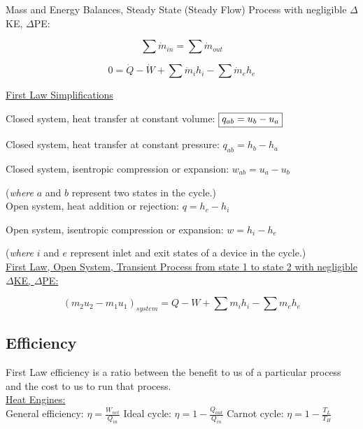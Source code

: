 \documentclass[10pt]{article}
\begin{document}
\noindent
Mass and Energy Balances, Steady State (Steady Flow) Process with negligible $\Delta$KE, $\Delta$PE:

$$\sum \dot{m}_{in} = \sum \dot{m}_{out}$$

$$0  = \dot Q - \dot W + \sum \dot{m}_{i}h_{i} -\sum \dot{m}_{e}h_{e}$$

\medskip


\underline{First Law Simplifications}

Closed system, heat transfer at constant volume: \hspace{0.25cm} $\boxed{$$q_{ab}=u_b-u_a}$

Closed system, heat transfer at constant pressure: \hspace{0.25cm} $\boxed{q_{ab}=h_b-h_a}$

Closed system, isentropic compression or expansion: \hspace{0.25cm} $\boxed{w_{ab}=u_a-u_b}$

(\textit{where} $a$ and $b$ represent two states in the cycle.)\\

Open system, heat addition or rejection: \hspace{0.25cm} $\boxed{q=h_e-h_i}$

Open system, isentropic compression or expansion: \hspace{0.25cm} $\boxed{w=h_i-h_e}$

(\textit{where} $i$ and $e$ represent inlet and exit states of a device in the cycle.)\\


\noindent
\underline{First Law, Open System, Transient Process from state 1 to state 2 with negligible $\Delta$KE, $\Delta$PE:}

$$(m_2u_2 - m_1u_1)_{system} = Q - W + \sum m_ih_i - \sum m_eh_e$$

\subsection{Efficiency}

First Law efficiency is a ratio between the benefit to us of a particular process and the cost to us to run that process.\\

\noindent
\underline{Heat Engines:} \\
\noindent
General efficiency: $\eta = \frac{W_{net}}{Q_{in}}$ \hspace{0.5cm} Ideal cycle: $\eta = 1-\frac{Q_{out}}{Q_{in}}$ \hspace{0.5cm} Carnot cycle: $\eta = 1-\frac{T_L}{T_H}$
\end{document}
